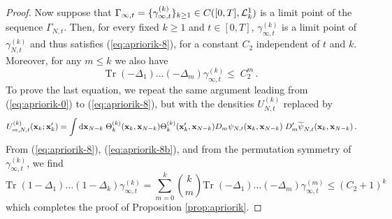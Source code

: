 \documentclass[11pt]{article}
\newcommand{\rd}{{\rm d}}
\newcommand{\bx}{{\bf x}}
\newcommand{\tr}{\mbox{Tr}}
\newcommand{\cL}{{\cal L}}
\begin{document}
\begin{proof}
Now suppose that $ \Gamma_{\infty,t} = \{ \gamma_{\infty,t}^{(k)}
\}_{k \geq 1} \in C([0,T], \cL^1_k)$ is a limit point of the
sequence $ \Gamma_{N,t}$. Then, for every fixed $k \geq 1$ and $t
\in [0,T]$, $ \gamma_{\infty,t}^{(k)}$ is a limit point of $
\gamma_{N,t}^{(k)}$ and thus satisfies (\ref{eq:apriorik-8}), for a
constant $C_2$ independent of $t$ and $k$. Moreover, for any $m \leq
k$ we also have
\begin{equation}\label{eq:apriorik-8b}
\tr \; (-\Delta_1) \dots (-\Delta_m)  \gamma^{(k)}_{\infty,t} \leq
\; C_2^m \,.
\end{equation}
To prove the last equation, we repeat the same argument leading from
(\ref{eq:apriorik-0}) to (\ref{eq:apriorik-8}), but with the
densities $U^{(k)}_{N,t}$ replaced by
\begin{equation}
U^{(k)}_{m,N,t} (\bx_k;\bx'_k) = \int \rd \bx_{N-k} \;
\Theta_k^{(k)} (\bx_k, \bx_{N-k}) \Theta_k^{(k)} (\bx'_k, \bx_{N-k})
D_m  \psi_{N,t} (\bx_k,\bx_{N-k}) \; D'_m \overline{ \psi}_{N,t}
(\bx_k,\bx_{N-k}) \,.
\end{equation}
{F}rom (\ref{eq:apriorik-8}), (\ref{eq:apriorik-8b}), and from the
permutation symmetry of $ \gamma_{\infty,t}^{(k)}$, we find
\begin{equation}
\tr \; (1-\Delta_1) \dots (1-\Delta_k)  \gamma_{\infty,t}^{(k)} =
\sum_{m=0}^k {k \choose m} \tr \; (-\Delta_1) \dots (-\Delta_m)
\gamma_{\infty,t}^{(m)} \leq (C_2 + 1)^k
\end{equation}
which completes the proof of Proposition \ref{prop:apriorik}.



\bigskip


\end{proof}
\end{document}
